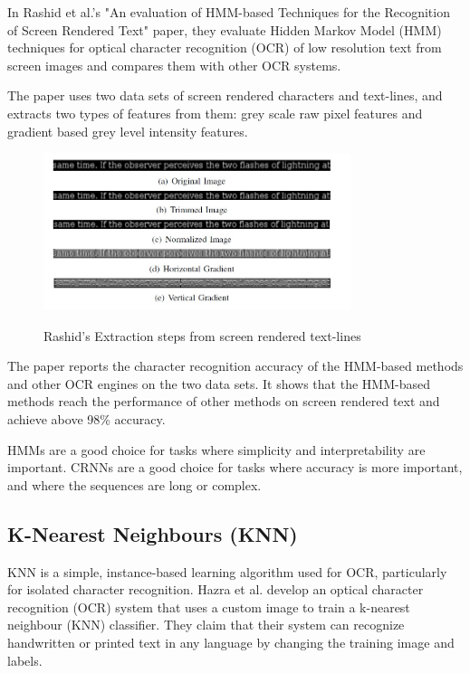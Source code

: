 In Rashid et al.'s "An evaluation of HMM-based Techniques for the Recognition of Screen Rendered Text" paper, they evaluate Hidden Markov Model (HMM) techniques for optical character recognition (OCR) of low resolution text from screen images and compares them with other OCR systems.

The paper uses two data sets of screen rendered characters and text-lines, and extracts two types of features from them: grey scale raw pixel features and gradient based grey level intensity features.


\begin{figure}[!h]
    \centering
    \includegraphics[width=0.8\textwidth]{Figures/HMM_Rashid.jpg}
    \caption[Rashid's Extraction steps from screen rendered text-lines]{Rashid's Extraction steps from screen rendered text-lines}\cite{rashidEvaluationHMMBasedTechniques2011}
    \label{fig:Rashid Feature Extraction Steps}
\end{figure}

The paper reports the character recognition accuracy of the HMM-based methods and other OCR engines on the two data sets. It shows that the HMM-based methods reach the performance of other methods on screen rendered text and achieve above 98\% accuracy.\cite{rashidEvaluationHMMBasedTechniques2011}

HMMs are a good choice for tasks where simplicity and interpretability are important. CRNNs are a good choice for tasks where accuracy is more important, and where the sequences are long or complex.

\newpage

\subsection{K-Nearest Neighbours (KNN)}

KNN is a simple, instance-based learning algorithm used for OCR, particularly for isolated character recognition. Hazra et al. develop an optical character recognition (OCR) system that uses a custom image to train a k-nearest neighbour (KNN) classifier. They claim that their system can recognize handwritten or printed text in any language by changing the training image and labels. \cite{hazraOpticalCharacterRecognition2017}

